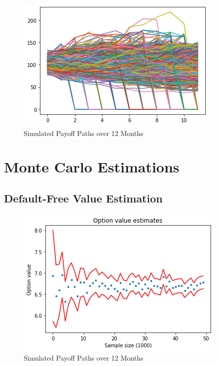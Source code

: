 \documentclass[11pt]{article}
\begin{document}
\begin{figure}
    \centering
    \caption{Simulated Payoff Paths over 12 Months}
    \includegraphics{images/all-paths.png}
\end{figure}

\section{Monte Carlo Estimations
}

\subsection{Default-Free Value Estimation}
\begin{figure}
    \centering
    \caption{Simulated Payoff Paths over 12 Months}
    \includegraphics{images/default-free.png}
\end{figure}
\end{document}
